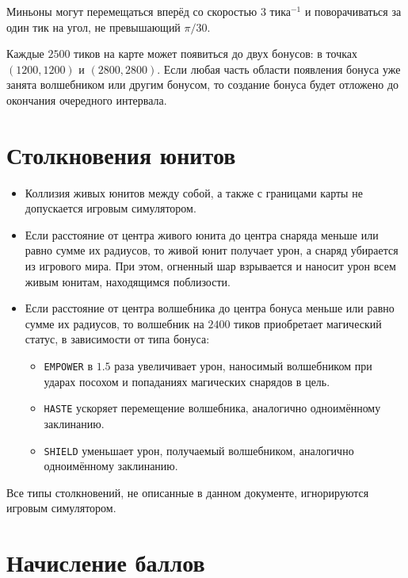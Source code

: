 Миньоны могут перемещаться вперёд со скоростью $3$ тика$^{-1}$ и поворачиваться за один тик на угол, не превышающий $\pi / 30$.

Каждые $2500$ тиков на карте может появиться до двух бонусов: в точках $(1200, 1200)$ и $(2800, 2800)$. Если любая часть области появления
бонуса уже занята волшебником или другим бонусом, то создание бонуса будет отложено до окончания очередного интервала.

\section{Столкновения юнитов}

\begin{itemize}
  \item Коллизия живых юнитов между собой, а также с границами карты не допускается игровым симулятором.
  \item Если расстояние от центра живого юнита до центра снаряда меньше или равно сумме их радиусов, то живой юнит получает урон, а снаряд
        убирается из игрового мира. При этом, огненный шар взрывается и наносит урон всем живым юнитам, находящимся поблизости.
  \item Если расстояние от центра волшебника до центра бонуса меньше или равно сумме их радиусов, то волшебник на $2400$ тиков приобретает
        магический статус, в зависимости от типа бонуса:
        \begin{itemize}
            \item \texttt{EMPOWER} в $1.5$ раза увеличивает урон, наносимый волшебником при ударах посохом и попаданиях магических снарядов
                  в цель.
            \item \texttt{HASTE} ускоряет перемещение волшебника, аналогично одноимённому заклинанию.
            \item \texttt{SHIELD} уменьшает урон, получаемый волшебником, аналогично одноимённому заклинанию.
        \end{itemize}
\end{itemize}

Все типы столкновений, не описанные в данном документе, игнорируются игровым симулятором.

\section{Начисление баллов}


